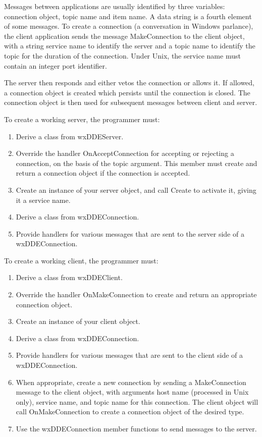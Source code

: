 Messages between applications are usually identified by three variables:
connection object, topic name and item name.  A data string is a fourth
element of some messages. To create a connection (a conversation in
Windows parlance), the client application sends the message
MakeConnection to the client object, with a string service name to
identify the server and a topic name to identify the topic for the
duration of the connection. Under Unix, the service name must contain an
integer port identifier.

The server then responds and either vetos the connection or allows it.
If allowed, a connection object is created which persists until the
connection is closed.  The connection object is then used for subsequent
messages between client and server.

To create a working server, the programmer must:

\begin{enumerate}\itemsep=0pt
\item Derive a class from wxDDEServer.
\item Override the handler OnAcceptConnection for accepting or rejecting a connection,
on the basis of the topic argument. This member must create and return a connection
object if the connection is accepted.
\item Create an instance of your server object, and call Create to
activate it, giving it a service name.
\item Derive a class from wxDDEConnection.
\item Provide handlers for various messages that are sent to the server
side of a wxDDEConnection.
\end{enumerate}

To create a working client, the programmer must:

\begin{enumerate}\itemsep=0pt
\item Derive a class from wxDDEClient.
\item Override the handler OnMakeConnection to create and return
an appropriate connection object.
\item Create an instance of your client object.
\item Derive a class from wxDDEConnection.
\item Provide handlers for various messages that are sent to the client
side of a wxDDEConnection.
\item When appropriate, create a new connection by sending a MakeConnection
message to the client object, with arguments host name (processed in Unix only),
service name, and topic name for this connection. The client object will call OnMakeConnection
to create a connection object of the desired type.
\item Use the wxDDEConnection member functions to send messages to the server.
\end{enumerate}

